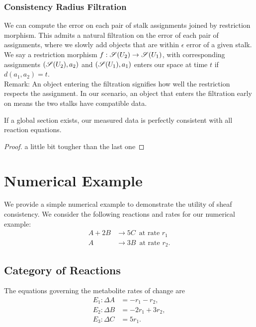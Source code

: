 \documentclass{article}
\begin{document}
\subsubsection{Consistency Radius Filtration} %
We can compute the error on each pair of stalk assignments joined by 
restriction 
morphism. This admits a natural filtration on the error of each pair of 
assignments, where we slowly add objects that are within $\epsilon$ error of a 
given stalk. We say a 
restriction morphism $f:\mathscr{S}(U_2) \to \mathscr{S}(U_1)$, with corresponding assignments 
$(\mathscr{S}(U_2),a_2)$ and  $(\mathscr{S}(U_1),a_1)$ enters our space at time $t$ if 
$d(a_1,a_2) = t$.\\ Remark: An object entering the filtration signifies how 
well the restriction respects the assignment. In our scenario, an object 
that enters the filtration early on means the two stalks have compatible data.

 \begin{theorem}
	If a global section exists, our measured data is perfectly consistent with 
	all reaction equations.
\end{theorem}
\begin{proof}
	a little bit tougher than the last one
\end{proof}


\section{Numerical Example}
We provide a simple numerical example to demonstrate the utility of sheaf 
consistency.
We consider the following reactions and rates for our numerical example:
\begin{align}
A + 2B &\rightarrow 5C \,\,\, \text{at rate $r_1$} \\
A &\rightarrow 3B \,\,\, \text{at rate $r_2$} .
\end{align}

\subsection{Category of Reactions}

The equations governing the metabolite rates of change are
\begin{align}
	E_1: \Delta A &= -r_1 - r_2,\\
	E_2: \Delta B &= -2r_1 + 3 r_2,\\
	E_3: \Delta C &= 5r_1.
\end{align}
\end{document}
